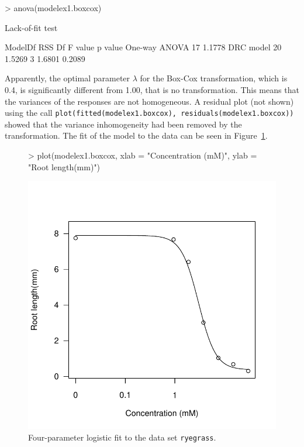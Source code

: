 \documentclass[a4paper]{article}
\begin{document}
\begin{Schunk}
\begin{Sinput}
> anova(modelex1.boxcox)
\end{Sinput}
\begin{Soutput}
Lack-of-fit test

              ModelDf    RSS Df F value p value
One-way ANOVA      17 1.1778                   
DRC model          20 1.5269  3  1.6801  0.2089
\end{Soutput}
\end{Schunk}

Apparently, the optimal parameter $\lambda$ for the Box-Cox transformation, which is 0.4, is significantly different from 1.00, that is no transformation.
This means that the variances of the responses are not homogeneous. A residual plot (not shown)
using the call \verb+plot(fitted(modelex1.boxcox), residuals(modelex1.boxcox))+ showed that the variance inhomogeneity had been removed by the
transformation.  The fit of the model to the data can be seen in Figure~\ref{fig-onefit:boxcox}.

\begin{figure}[!htbp]
\begin{center}

\begin{Schunk}
\begin{Sinput}
> plot(modelex1.boxcox, xlab = "Concentration (mM)", ylab = "Root length(mm)")
\end{Sinput}
\end{Schunk}
\includegraphics{drc-sec4-plot1}
\caption{Four-parameter logistic fit to the data set \texttt{ryegrass}.} \label{fig-onefit:boxcox}
\end{center}
\end{figure}
\end{document}
